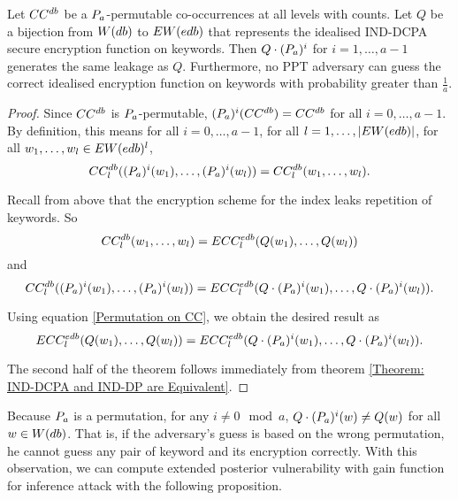 \begin{theorem} \label{Theorem: Permutability of Encryption implies Security}
Let $CC^{db}$ be a $P_a$-permutable co-occurrences at all levels with counts. Let $Q$ be a bijection from $W(db)$ to $EW(edb)$ that represents the idealised IND-DCPA secure encryption function on keywords. Then $Q \cdot (P_a)^i$ for $i=1,\dots, a-1$ generates the same leakage as $Q$. Furthermore, no PPT adversary can guess the correct idealised encryption function on keywords with probability greater than $\frac{1}{a}$.
\end{theorem}


\begin{proof}
Since $CC^{db}$ is $P_a$-permutable, $(P_a)^i (CC^{db}) = CC^{db}$ for all $i = 0, \dots, a-1$. By definition, this means for all $i = 0, \dots, a-1$, for all $l = 1, \dots, |EW(edb)|$, for all $w_1, \dots, w_l \in EW(edb)^l$, 
\begin{equation}
CC_{l}^{db}((P_a)^i(w_1), \dots, (P_a)^i(w_l)) = CC_{l}^{db}(w_1, \dots, w_l). \label{Permutation on CC}
\end{equation}

Recall from above that the encryption scheme for the index leaks repetition of keywords. So
\begin{equation}
	CC_{l}^{db}(w_1, \dots, w_l) = ECC_{l}^{edb}(Q(w_1), \dots, Q(w_l))
\end{equation}
and 
\begin{equation}
CC_{l}^{db}((P_a)^i(w_1), \dots, (P_a)^i(w_l)) = ECC_{l}^{edb}(Q \cdot (P_a)^i(w_1), \dots, Q \cdot (P_a)^i(w_l)).
\end{equation}

Using equation \ref{Permutation on CC}, we obtain the desired result as
\begin{equation}
	ECC_{l}^{edb}(Q(w_1), \dots, Q(w_l)) = ECC_{l}^{edb}(Q \cdot (P_a)^i(w_1), \dots, Q \cdot (P_a)^i(w_l)).
\end{equation}

The second half of the theorem follows immediately from theorem \ref{Theorem: IND-DCPA and IND-DP are Equivalent}.
\end{proof}

Because $P_a$ is a permutation, for any $i \neq 0 \mod a$, $Q \cdot (P_a)^i(w) \neq Q(w)$ for all $w \in W(db)$. That is, if the adversary's guess is based on the wrong permutation, he cannot guess any pair of keyword and its encryption correctly. With this observation, we can compute extended posterior vulnerability with gain function for inference attack with the following proposition.


